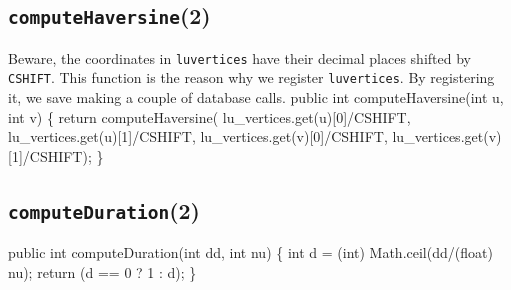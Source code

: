 \documentclass{article}
\def\nwendcode{\endtrivlist \endgroup}      %
\let\nwdocspar=\par
\begin{document}
\subsection{{\tt{}\protect{}computeHaversine}(2)}
Beware, the coordinates in {\tt{}\protect{}lu{}vertices} have their decimal places shifted by
{\tt{}\protect{}CSHIFT}. This function is the reason why we register {\tt{}\protect{}lu{}vertices}.
By registering it, we save making a couple of database calls.
\nwenddocs{}\plusendmoddef
public int computeHaversine(int u, int v) \{
  return computeHaversine(
    lu_vertices.get(u)[0]/CSHIFT, lu_vertices.get(u)[1]/CSHIFT,
    lu_vertices.get(v)[0]/CSHIFT, lu_vertices.get(v)[1]/CSHIFT);
\}
\nwendcode{}\nwdocspar

\subsection{{\tt{}computeDuration}(2)}
\nwenddocs{}\endmoddef{}
public int computeDuration(int dd, int nu) \{
  int d = (int) Math.ceil(dd/(float) nu);
  return (d == 0 ? 1 : d);
\}
\nwendcode{}\nwdocspar
\end{document}
